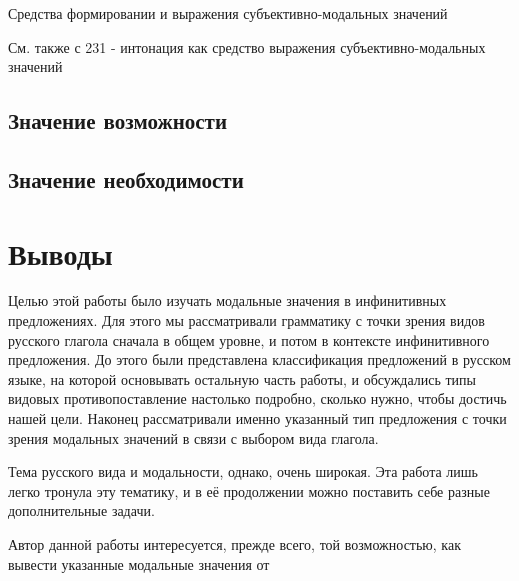 \documentclass{article}
\begin{document}
Средства формировании и выражения субъективно-модальных значений

См. также с 231 - интонация как средство выражения субъективно-модальных значений


\subsection{Значение возможности}

\subsection{Значение необходимости}



\section{Выводы}

Целью этой работы было изучать модальные значения в инфинитивных предложениях. Для этого мы рассматривали грамматику с точки зрения видов русского глагола сначала в общем уровне, и потом в контексте инфинитивного предложения. До этого были представлена классификация предложений в русском языке, на которой основывать остальную часть работы, и обсуждались типы видовых противопоставление настолько подробно, сколько нужно, чтобы достичь нашей цели. Наконец рассматривали именно указанный тип предложения с точки зрения модальных значений в связи с выбором вида глагола.

Тема русского вида и модальности, однако, очень широкая. Эта работа лишь легко тронула эту тематику, и в её продолжении можно поставить себе разные дополнительные задачи. 

Автор данной работы интересуется, прежде всего, той возможностью, как вывести указанные модальные значения от 






\printbibliography[heading=bibintoc,title={Список использоваемой литературы}]


%
%
\end{document}
